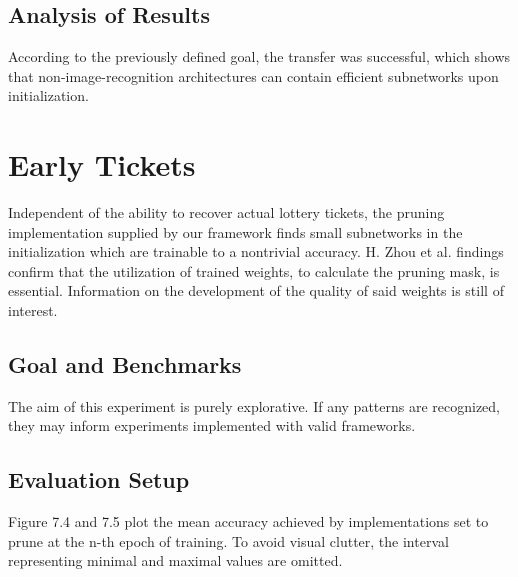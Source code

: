 \subsection*{Analysis of Results}
According to the previously defined goal, the transfer was successful, which shows that non-image-recognition architectures can contain efficient subnetworks upon initialization.


\section{Early Tickets}
Independent of the ability to recover actual lottery tickets, the pruning implementation supplied by our framework finds small subnetworks in the initialization which are trainable to a nontrivial accuracy. H. Zhou et al. findings confirm that the utilization of trained weights, to calculate the pruning mask, is essential.\cite{Deconstructing_LTH} Information on the development of the quality of said weights is still of interest. 
\subsection*{Goal and Benchmarks}
The aim of this experiment is purely explorative. If any patterns are recognized, they may inform experiments implemented with valid frameworks.
\subsection*{Evaluation Setup}
Figure 7.4 and 7.5 plot the mean accuracy achieved by implementations set to prune at the n-th epoch of training. To avoid visual clutter, the interval representing minimal and maximal values are omitted. 
